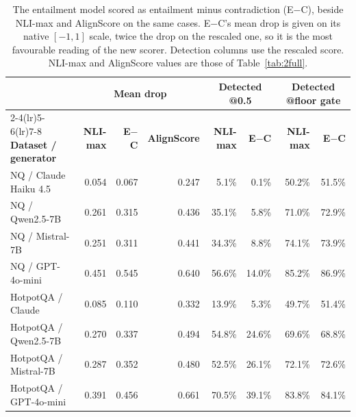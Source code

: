 \documentclass[11pt]{article}
\begin{document}
\begin{table}[t]
\centering
\small
\begin{tabular}{lrrrrrrr}
\toprule
 & \multicolumn{3}{c}{\textbf{Mean drop}} & \multicolumn{2}{c}{\textbf{Detected @0.5}} & \multicolumn{2}{c}{\textbf{Detected @floor gate}} \\
\cmidrule(lr){2-4}\cmidrule(lr){5-6}\cmidrule(lr){7-8}
\textbf{Dataset / generator} & \textbf{NLI-max} & \textbf{E$-$C} & \textbf{AlignScore} & \textbf{NLI-max} & \textbf{E$-$C} & \textbf{NLI-max} & \textbf{E$-$C} \\
\midrule
NQ / Claude Haiku 4.5 & 0.054 & 0.067 & 0.247 & 5.1\% & 0.1\% & 50.2\% & 51.5\% \\
NQ / Qwen2.5-7B & 0.261 & 0.315 & 0.436 & 35.1\% & 5.8\% & 71.0\% & 72.9\% \\
NQ / Mistral-7B & 0.251 & 0.311 & 0.441 & 34.3\% & 8.8\% & 74.1\% & 73.9\% \\
NQ / GPT-4o-mini & 0.451 & 0.545 & 0.640 & 56.6\% & 14.0\% & 85.2\% & 86.9\% \\
\midrule
HotpotQA / Claude & 0.085 & 0.110 & 0.332 & 13.9\% & 5.3\% & 49.7\% & 51.4\% \\
HotpotQA / Qwen2.5-7B & 0.270 & 0.337 & 0.494 & 54.8\% & 24.6\% & 69.6\% & 68.8\% \\
HotpotQA / Mistral-7B & 0.287 & 0.352 & 0.480 & 52.5\% & 26.1\% & 72.1\% & 72.6\% \\
HotpotQA / GPT-4o-mini & 0.391 & 0.456 & 0.661 & 70.5\% & 39.1\% & 83.8\% & 84.1\% \\
\bottomrule
\end{tabular}
\caption{The entailment model scored as entailment minus contradiction (E$-$C), beside NLI-max and AlignScore on the same cases. E$-$C's mean drop is given on its native $[-1,1]$ scale, twice the drop on the rescaled one, so it is the most favourable reading of the new scorer. Detection columns use the rescaled score. NLI-max and AlignScore values are those of Table~\ref{tab:2full}.}
\label{tab:ec}
\end{table}
\end{document}
